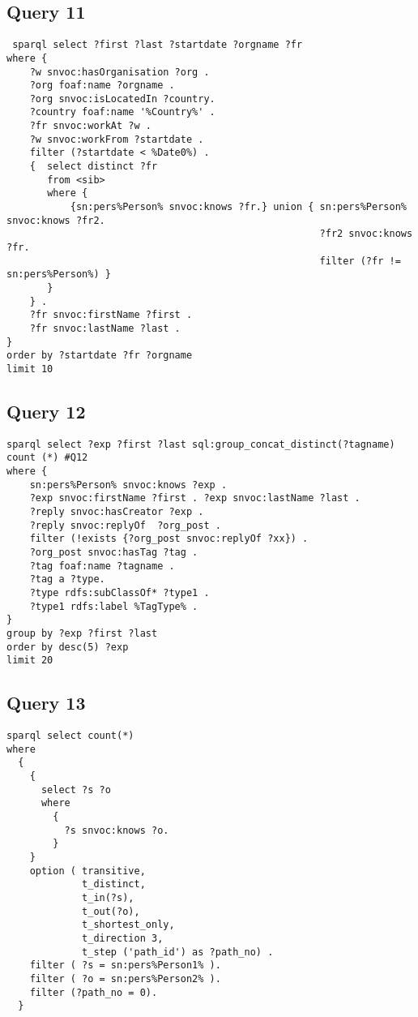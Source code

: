  

\subsection{Query 11}
\begin{verbatim}
 sparql select ?first ?last ?startdate ?orgname ?fr 
where {
    ?w snvoc:hasOrganisation ?org .
    ?org foaf:name ?orgname .
    ?org snvoc:isLocatedIn ?country.
    ?country foaf:name '%Country%' .
    ?fr snvoc:workAt ?w .
    ?w snvoc:workFrom ?startdate .
    filter (?startdate < %Date0%) .
    {  select distinct ?fr
       from <sib>
       where {
           {sn:pers%Person% snvoc:knows ?fr.} union { sn:pers%Person% snvoc:knows ?fr2.
                                                      ?fr2 snvoc:knows ?fr.
                                                      filter (?fr != sn:pers%Person%) }
       }
    } .
    ?fr snvoc:firstName ?first .
    ?fr snvoc:lastName ?last .
}
order by ?startdate ?fr ?orgname
limit 10
\end{verbatim}


\subsection{Query 12}
\begin{verbatim}
sparql select ?exp ?first ?last sql:group_concat_distinct(?tagname) count (*) #Q12
where {
    sn:pers%Person% snvoc:knows ?exp .
    ?exp snvoc:firstName ?first . ?exp snvoc:lastName ?last .
    ?reply snvoc:hasCreator ?exp .
    ?reply snvoc:replyOf  ?org_post .
    filter (!exists {?org_post snvoc:replyOf ?xx}) .
    ?org_post snvoc:hasTag ?tag .
    ?tag foaf:name ?tagname .
    ?tag a ?type.
    ?type rdfs:subClassOf* ?type1 .
    ?type1 rdfs:label %TagType% .
}
group by ?exp ?first ?last
order by desc(5) ?exp
limit 20
\end{verbatim}


\subsection{Query 13} 
\begin{verbatim}
sparql select count(*) 
where
  {
    {
      select ?s ?o
      where
        {
          ?s snvoc:knows ?o.
        }
    }
    option ( transitive,
             t_distinct,
             t_in(?s),
             t_out(?o),
             t_shortest_only,
             t_direction 3,
             t_step ('path_id') as ?path_no) .
    filter ( ?s = sn:pers%Person1% ).
    filter ( ?o = sn:pers%Person2% ).
    filter (?path_no = 0).
  }
\end{verbatim}


